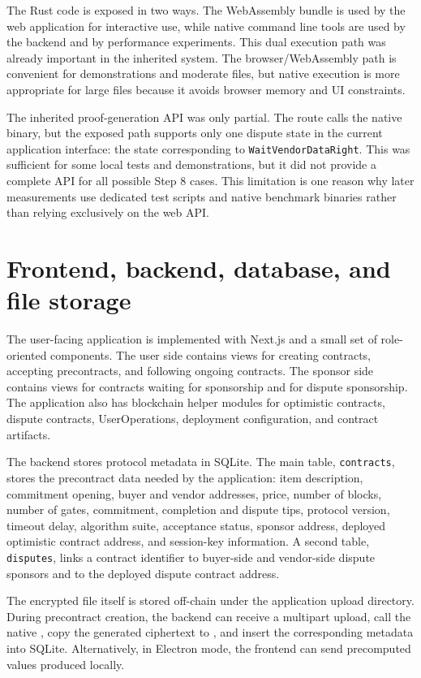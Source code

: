 The Rust code is exposed in two ways. The WebAssembly bundle is used by the web application
for interactive use, while native command line tools are used by the backend and by
performance experiments. This dual execution path was already important in the inherited
system. The browser/WebAssembly path is convenient for demonstrations and moderate files,
but native execution is more appropriate for large files because it avoids browser memory
and UI constraints.

The inherited proof-generation API was only partial. The route
 calls the native 
binary, but the exposed path supports only one dispute state in the current application
interface: the state corresponding to \texttt{WaitVendorDataRight}. This was sufficient for
some local tests and demonstrations, but it did not provide a complete API for all possible
Step 8 cases. This limitation is one reason why later measurements use dedicated test
scripts and native benchmark binaries rather than relying exclusively on the web API.

\section{Frontend, backend, database, and file storage}

The user-facing application is implemented with Next.js and a small set of role-oriented
components. The user side contains views for creating contracts, accepting precontracts, and
following ongoing contracts. The sponsor side contains views for contracts waiting for
sponsorship and for dispute sponsorship. The application also has blockchain helper modules
for optimistic contracts, dispute contracts, UserOperations, deployment configuration, and
contract artifacts.

The backend stores protocol metadata in SQLite. The main table, \texttt{contracts}, stores
the precontract data needed by the application: item description, commitment opening,
buyer and vendor addresses, price, number of blocks, number of gates, commitment,
completion and dispute tips, protocol version, timeout delay, algorithm suite, acceptance
status, sponsor address, deployed optimistic contract address, and session-key information.
A second table, \texttt{disputes}, links a contract identifier to buyer-side and vendor-side
dispute sponsors and to the deployed dispute contract address.

The encrypted file itself is stored off-chain under the application upload directory. During
precontract creation, the backend can receive a multipart upload, call the native
, copy the generated ciphertext to , and insert
the corresponding metadata into SQLite. Alternatively, in Electron mode, the frontend can
send precomputed values produced locally.

